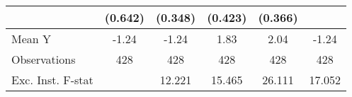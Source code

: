 {\begin{tabular}{l*{5}{c}}
            &     (0.642)         &     (0.348)         &     (0.423)         &     (0.366)         &                     \\
\midrule
Mean Y      &       -1.24         &       -1.24         &        1.83         &        2.04         &       -1.24         \\
Observations&         428         &         428         &         428         &         428         &         428         \\
Exc. Inst. F-stat&                     &      12.221         &      15.465         &      26.111         &      17.052         \\
\bottomrule
\end{tabular}
}
